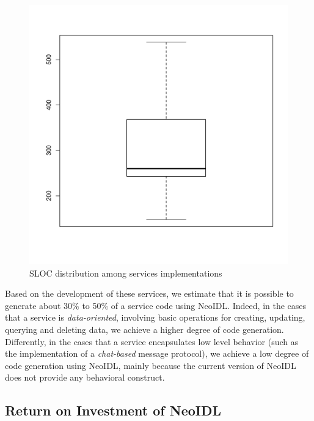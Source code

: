 \documentclass{ws-ijseke}
\newcommand{\neoidl}{NeoIDL}
\begin{document}
\begin{figure}[thb]
\begin{center}
\vspace{-1cm}
\includegraphics[scale=0.5]{sloc-boxplot.pdf}
\vspace{-1.5cm}
\end{center}
\caption{SLOC distribution among services implementations}
\label{fig:sloc-boxplot}
\end{figure}

Based on the development of these services, we estimate that 
it is possible to generate about 30\% to 50\% of
a service code using \neoidl. Indeed, in the cases that a service is
\emph{data-oriented}, involving basic operations for creating,
updating, querying and deleting data, we achieve a higher degree of
code generation. Differently, in the cases that a service encapsulates low level
behavior (such as the implementation of a \emph{chat-based} message protocol), 
we achieve a low degree of code generation using \neoidl, 
mainly because the current version of \neoidl{} does
not provide any behavioral construct. 

\subsection{Return on Investment of \neoidl}\label{sub:roi}
\end{document}

